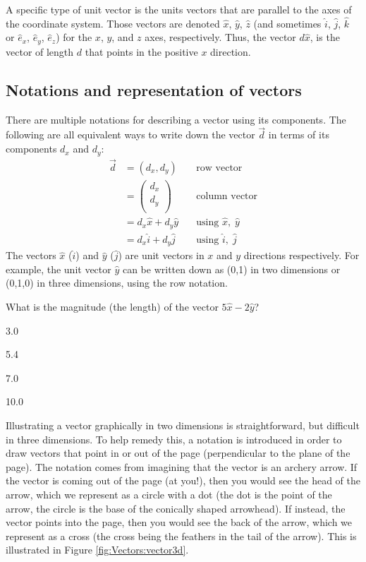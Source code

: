 A specific type of unit vector is the units vectors that are parallel to the axes of the coordinate system. Those vectors are denoted $\hat x$, $\hat y$, $\hat z$ (and sometimes $\hat i$, $\hat j$, $\hat k$ or $\hat e_x$, $\hat e_y$, $\hat e_z$) for the $x$, $y$, and $z$ axes, respectively. Thus, the vector $d\hat{x}$, is the vector of length $d$ that points in the positive $x$ direction. 

\subsection{Notations and representation of vectors}
There are multiple notations for describing a vector using its components. The following are all equivalent ways to write down the vector $\vec d$ in terms of its components $d_x$ and $d_y$:
\begin{align*}
\vec d &= (d_x,d_y)\quad&\text{row vector}\\
       &=\begin{pmatrix}
           d_x \\
           d_y \\
         \end{pmatrix}\quad&\text{column vector}\\
         &= d_x\hat x +d_y \hat y\quad&\text{using }\hat x,\;\hat y\\
         &=d_x\hat i +d_y \hat j \quad&\text{using }\hat i,\;\hat j
\end{align*}
The vectors $\hat x$ ($\hat i$) and $\hat y$ ($\hat j$) are unit vectors in $x$ and $y$ directions respectively.
For example, the unit vector $\hat y$ can be written down as (0,1) in two dimensions or (0,1,0) in three dimensions, using the row notation.

\begin{checkpoint}
\begin{MCquestion}{What is the magnitude (the length) of the vector $5\hat x-2\hat y$?}
\item 3.0
\item 5.4 \correct
\item 7.0
\item 10.0
\end{MCquestion}
\end{checkpoint}

Illustrating a vector graphically in two dimensions is straightforward, but difficult in three dimensions. To help remedy this, a notation is introduced in order to draw vectors that point in or out of the page (perpendicular to the plane of the page). The notation comes from imagining that the vector is an archery arrow. If the vector is coming out of the page (at you!), then you would see the head of the arrow, which we represent as a circle with a dot (the dot is the point of the arrow, the circle is the base of the conically shaped arrowhead). If instead, the vector points into the page, then you would see the back of the arrow, which we represent as a cross (the cross being the feathers in the tail of the arrow). This is illustrated in Figure \ref{fig:Vectors:vector3d}.

